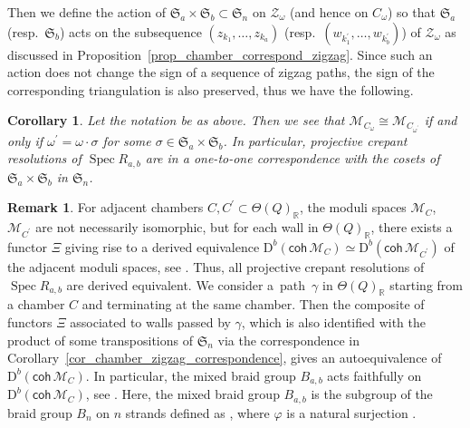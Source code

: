 \documentclass[pdftex]{sigma}
\numberwithin{equation}{section}
\newtheorem{Corollary}[Theorem]{Corollary}
\theoremstyle{definition}
\newtheorem{Remark}[Theorem]{Remark}
\newcommand{\RR}{\mathbb{R}}
\newcommand{\calM}{\mathcal{M}}
\newcommand{\calZ}{\mathcal{Z}}
\newcommand{\rmD}{\mathrm{D}}
\newcommand{\fkS}{\mathfrak{S}}
\newcommand{\Spec}{\operatorname{Spec}}
\newcommand{\permII}{\omega}
\begin{document}
Then we define the action of $\fkS_a\times \fkS_b\subset \fkS_n$ on $\calZ_\permII$ (and hence on $C_\permII$) so that
$\fkS_a$ (resp.\ $\fkS_b$) acts on the subsequence $(z_{k_1},\dots, z_{k_a})$ (resp.\ $(w_{k^\prime_1}, \dots, w_{k^\prime_b})$) of $\calZ_\permII$
as discussed in Proposition~\ref{prop_chamber_correspond_zigzag}.
Since such an action does not change the sign of a sequence of zigzag paths, the sign of the corresponding triangulation is also preserved,
thus we have the following.

\begin{Corollary}
\label{cor_isomclass_chambers}
Let the notation be as above. Then we see that
$\calM_{C_\permII}\cong\calM_{C_{\permII^\prime}}$ if and only if $\permII^\prime=\permII\cdot\sigma$ for some $\sigma \in\fkS_a\times\fkS_b$.
In particular, projective crepant resolutions of $\Spec R_{a,b}$ are in a one-to-one correspondence with the cosets of $\fkS_a\times\fkS_b$ in $\fkS_n$.
\end{Corollary}

\begin{Remark}
For adjacent chambers $C, C^\prime \subset\Theta(Q)_\RR$, the moduli spaces $\calM_C$, $\calM_{C^\prime}$ are not necessarily isomorphic,
but for each wall in $\Theta(Q)_\RR$, there exists a functor $\Xi$ giving rise to a derived equivalence $\rmD^b(\mathsf{coh}\,\calM_C)\simeq \rmD^b(\mathsf{coh}\,\calM_{C^\prime})$ of the adjacent moduli spaces, see \cite[Theorem~11.1]{IU_anycrepant}.
Thus, all projective crepant resolutions of $\Spec R_{a,b}$ are derived equivalent.
We consider a~path~$\gamma$ in $\Theta(Q)_\RR$ starting from a chamber $C$ and terminating at the same chamber.
Then the composite of functors $\Xi$ associated to walls passed by $\gamma$, which is also identified with the product of some transpositions
of $\fkS_n$ via the correspondence in Corollary~\ref{cor_chamber_zigzag_correspondence}, gives an autoequivalence of $\rmD^b(\mathsf{coh}\,\calM_C)$.
In particular, the mixed braid group $B_{a,b}$ acts faithfully on $\rmD^b(\mathsf{coh}\,\calM_C)$, see \cite[Theorem~1]{DS_mixed}.
Here, the mixed braid group $B_{a,b}$ is the subgroup of the braid group $B_n$ on $n$ strands defined as \smash{$\varphi^{-1}(\fkS_a\times\fkS_b)$},
where $\varphi$ is a natural surjection \smash{$B_n\xrightarrow{\varphi} \fkS_n$}.
\end{Remark}
\end{document}
